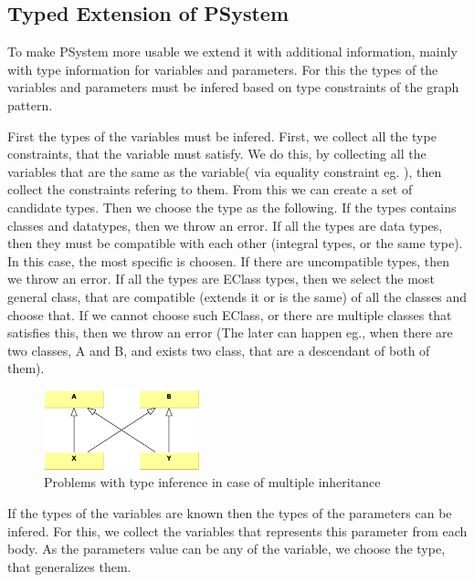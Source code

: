 

\subsection{Typed Extension of PSystem}

To make PSystem more usable we extend it with additional information, mainly with type information for variables and parameters.
For this the types of the variables and parameters must be infered based on type constraints of the graph pattern.

First the types of the variables must be infered. 
First, we collect all the type constraints, that the variable must satisfy.
We do this, by collecting all the variables that are the same as the variable( via equality constraint eg. ), 
then collect the constraints refering to them.
From this we can create a set of candidate types.
Then we choose the type as the following. 
If the types contains classes and datatypes, then we throw an error.
If all the types are data types, then they must be compatible with each other (integral types, or the same type).
In this case, the most specific is choosen. If there are uncompatible types, then we throw an error.
If all the types are EClass types, then we select the most general class, that are compatible (extends it or is the same) of all the classes and choose that.
If we cannot choose such EClass, or there are multiple classes that satisfies this, then we throw an error (The later can happen eg., when there are two classes, A and B, and exists two class, that are a descendant of both of them).


\begin{figure}[h]
	\begin{center}
		\includegraphics[width=0.4\textwidth]{figures/multiple-inheritance-problem.pdf}
		\caption{Problems with type inference in case of multiple inheritance}
		\label{fig:multiple-inheritance-problem}
	\end{center}
\end{figure}

If the types of the variables are known then the types of the parameters can be infered. 
For this, we collect the variables that represents this parameter from each body.
As the parameters value can be any of the variable, we choose the type, that generalizes them.

